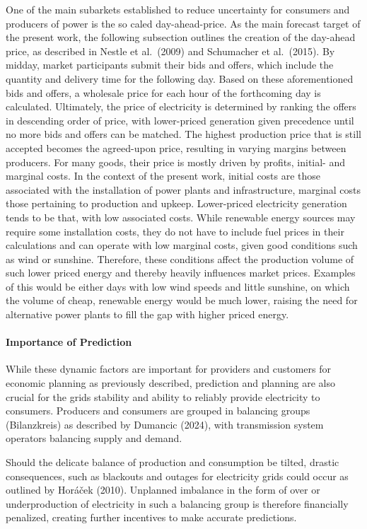 \documentclass[a4paper]{article}
\begin{document}
One of the main subarkets established to reduce uncertainty for
consumers and producers of power is the so caled day-ahead-price. As the
main forecast target of the present work, the following subsection
outlines the creation of the day-ahead price, as described in Nestle et
al.~(2009) and Schumacher et al.~(2015). By midday, market participants
submit their bids and offers, which include the quantity and delivery
time for the following day. Based on these aforementioned bids and
offers, a wholesale price for each hour of the forthcoming day is
calculated. Ultimately, the price of electricity is determined by
ranking the offers in descending order of price, with lower-priced
generation given precedence until no more bids and offers can be
matched. The highest production price that is still accepted becomes the
agreed-upon price, resulting in varying margins between producers. For
many goods, their price is mostly driven by profits, initial- and
marginal costs. In the context of the present work, initial costs are
those associated with the installation of power plants and
infrastructure, marginal costs those pertaining to production and
upkeep. Lower-priced electricity generation tends to be that, with low
associated costs. While renewable energy sources may require some
installation costs, they do not have to include fuel prices in their
calculations and can operate with low marginal costs, given good
conditions such as wind or sunshine. Therefore, these conditions affect
the production volume of such lower priced energy and thereby heavily
influences market prices. Examples of this would be either days with low
wind speeds and little sunshine, on which the volume of cheap, renewable
energy would be much lower, raising the need for alternative power
plants to fill the gap with higher priced energy.

\paragraph{Importance of Prediction}\label{importance-of-prediction}

While these dynamic factors are important for providers and customers
for economic planning as previously described, prediction and planning
are also crucial for the grids stability and ability to reliably provide
electricity to consumers. Producers and consumers are grouped in
balancing groups (Bilanzkreis) as described by Dumancic (2024), with
transmission system operators balancing supply and demand.

Should the delicate balance of production and consumption be tilted,
drastic consequences, such as blackouts and outages for electricity
grids could occur as outlined by Horáček (2010). Unplanned imbalance in
the form of over or underproduction of electricity in such a balancing
group is therefore financially penalized, creating further incentives to
make accurate predictions.
\end{document}

